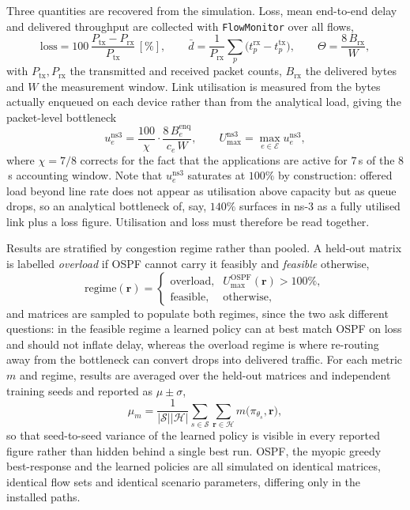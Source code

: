 Three quantities are recovered from the simulation. Loss, mean end-to-end delay and delivered
throughput are collected with \texttt{FlowMonitor} over all flows,
\begin{equation}
\mathrm{loss} = 100\,\frac{P_{\mathrm{tx}} - P_{\mathrm{rx}}}{P_{\mathrm{tx}}}\,[\%],
\qquad
\bar{d} = \frac{1}{P_{\mathrm{rx}}}\sum_{p} \bigl(t^{\mathrm{rx}}_p - t^{\mathrm{tx}}_p\bigr),
\qquad
\Theta = \frac{8\,B_{\mathrm{rx}}}{W},
\end{equation}
with $P_{\mathrm{tx}}, P_{\mathrm{rx}}$ the transmitted and received packet counts,
$B_{\mathrm{rx}}$ the delivered bytes and $W$ the measurement window. Link utilisation is measured
from the bytes actually enqueued on each device rather than from the analytical load, giving the
packet-level bottleneck
\begin{equation}
u^{\mathrm{ns3}}_e = \frac{100}{\chi}\cdot\frac{8\,B^{\mathrm{enq}}_e}{c_e\,W},
\qquad
U^{\mathrm{ns3}}_{\max} = \max_{e\in\mathcal{E}} u^{\mathrm{ns3}}_e ,
\end{equation}
where $\chi = 7/8$ corrects for the fact that the applications are active for $7$\,s of the $8$\,s
accounting window. Note that $u^{\mathrm{ns3}}_e$ saturates at $100\%$ by construction: offered
load beyond line rate does not appear as utilisation above capacity but as queue drops, so an
analytical bottleneck of, say, $140\%$ surfaces in \mbox{ns-3} as a fully utilised link plus a
loss figure. Utilisation and loss must therefore be read together.

Results are stratified by congestion regime rather than pooled. A held-out matrix is labelled
\emph{overload} if OSPF cannot carry it feasibly and \emph{feasible} otherwise,
\begin{equation}
\mathrm{regime}(\mathbf{r}) =
\begin{cases}
\text{overload}, & U^{\mathrm{OSPF}}_{\max}(\mathbf{r}) > 100\%,\\[2pt]
\text{feasible}, & \text{otherwise},
\end{cases}
\end{equation}
and matrices are sampled to populate both regimes, since the two ask different questions: in the
feasible regime a learned policy can at best match OSPF on loss and should not inflate delay,
whereas the overload regime is where re-routing away from the bottleneck can convert drops into
delivered traffic. For each metric $m$ and regime, results are averaged over the held-out
matrices and independent training seeds and reported as $\mu \pm \sigma$,
\begin{equation}
\mu_m = \frac{1}{|\mathcal{S}||\mathcal{H}|}\sum_{s\in\mathcal{S}}\sum_{\mathbf{r}\in\mathcal{H}}
m\bigl(\pi_{\theta_s}, \mathbf{r}\bigr),
\end{equation}
so that seed-to-seed variance of the learned policy is visible in every reported figure rather
than hidden behind a single best run. OSPF, the myopic greedy best-response and the learned
policies are all simulated on identical matrices, identical flow sets and identical scenario
parameters, differing only in the installed paths.
